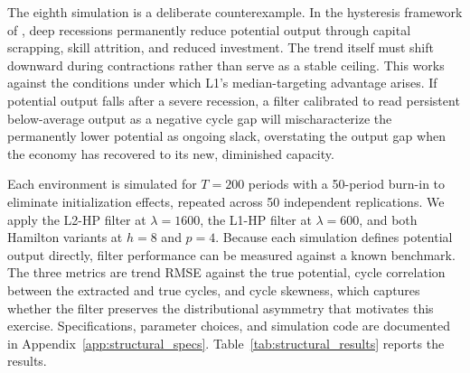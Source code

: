 \documentclass[10pt]{article}
\begin{document}
The eighth simulation is a deliberate counterexample. In the hysteresis framework of \citet{blanchard_summers1986}, deep recessions permanently reduce potential output through capital scrapping, skill attrition, and reduced investment. The trend itself must shift downward during contractions rather than serve as a stable ceiling. This works against the conditions under which L1's median-targeting advantage arises. If potential output falls after a severe recession, a filter calibrated to read persistent below-average output as a negative cycle gap will mischaracterize the permanently lower potential as ongoing slack, overstating the output gap when the economy has recovered to its new, diminished capacity.

Each environment is simulated for $T = 200$ periods with a 50-period burn-in to eliminate initialization effects, repeated across 50 independent replications. We apply the L2-HP filter at $\lambda = 1600$, the L1-HP filter at $\lambda = 600$, and both Hamilton variants at $h = 8$ and $p = 4$. Because each simulation defines potential output directly, filter performance can be measured against a known benchmark. The three metrics are trend RMSE against the true potential, cycle correlation between the extracted and true cycles, and cycle skewness, which captures whether the filter preserves the distributional asymmetry that motivates this exercise. Specifications, parameter choices, and simulation code are documented in Appendix~\ref{app:structural_specs}. Table~\ref{tab:structural_results} reports the results.
\end{document}
